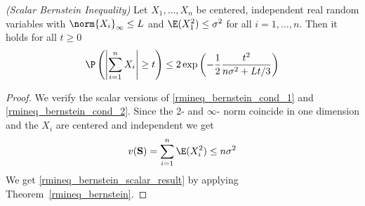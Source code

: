 \begin{corollary}
  \emph{(Scalar Bernstein Inequality)}
  \label{rmineq_bernstein_scalar}
Let
$
  X_1, \ldots , X_n
$
be centered, independent real random variables with
$
  \norm{X_i}_\infty
  \le
  L
$
and
$
  \E(X_1^2)
  \le
  \sigma^2
$
for all $i = 1, \ldots, n$.
Then it holds for all $ t \ge 0 $
\begin{gather}
  \label{rmineq_bernstein_scalar_result}
  \P
  \left( 
    \left| 
      \sum_{i = 1}^{n} 
        X_i
    \right|
    \ge
    t
  \right)
  \le
  2
  \exp
  \left( 
    -
    \frac{1}{2}
    \frac{t^2}
    {
      n\sigma^2 
      +
      Lt/3
    }
  \right)
\end{gather}
\end{corollary}
\begin{proof}
  We verify the scalar versions of
  \eqref{rmineq_bernstein_cond_1}
  and
  \eqref{rmineq_bernstein_cond_2}.
  Since the 2- and $\infty$- norm coincide in one dimension and
  the $X_i$ are centered and independent we get
  \begin{gather}
    v(\mathbf{S})
    =
    \sum_{i = 1}^{n}
        \E(X_i^2)
    \le
    n\sigma^2
  \end{gather}
  We get \eqref{rmineq_bernstein_scalar_result}
  by applying Theorem~\ref{rmineq_bernstein}.
\end{proof}

